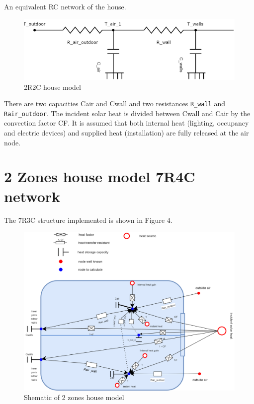 \documentclass[a4paper,10pt]{article}
\begin{document}
An equivalent RC network of the house.

\begin{figure}[H]
	\centering
	\includegraphics[width=1.0\columnwidth]{Pictures/2R2C_Model.png}
	\caption[Short title]{2R2C house model}
	\label{row house}
	\end{figure}
	
There are two capacities Cair and Cwall and two resistances \texttt{R\_wall} and \texttt{Rair\_outdoor}. The incident solar heat is divided between Cwall and Cair by the convection factor CF. It is assumed that both internal heat (lighting, occupancy and electric devices) and supplied heat (installation) are fully released at the air node. 



\section{2 Zones house model 7R4C network}

The 7R3C structure implemented is shown in Figure 4.
	
\begin{figure}[H]
	\centering
	\includegraphics[width=1.0\columnwidth]{Pictures/House_electrical_cricuits overview.png}
	\caption[Short title]{Shematic of 2 zones house model}
	\label{row house}
	\end{figure} 
	
\end{document}
